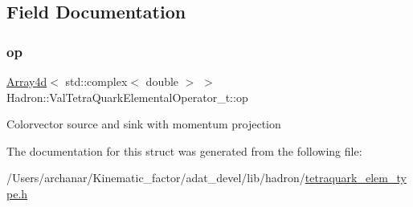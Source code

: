 \subsection{Field Documentation}
\mbox{\label{structHadron_1_1ValTetraQuarkElementalOperator__t_aa84effaf85576ba8df20869ed465a59e}} 
\subsubsection{\texorpdfstring{op}{op}}
{\footnotesize\ttfamily \mbox{\hyperlink{classXMLArray_1_1Array4d}{Array4d}}$<$ std\+::complex$<$ double $>$ $>$ Hadron\+::\+Val\+Tetra\+Quark\+Elemental\+Operator\+\_\+t\+::op}

Colorvector source and sink with momentum projection 

The documentation for this struct was generated from the following file\+:\begin{DoxyCompactItemize}
\item 
/\+Users/archanar/\+Kinematic\+\_\+factor/adat\+\_\+devel/lib/hadron/\mbox{\hyperlink{lib_2hadron_2tetraquark__elem__type_8h}{tetraquark\+\_\+elem\+\_\+type.\+h}}\end{DoxyCompactItemize}
